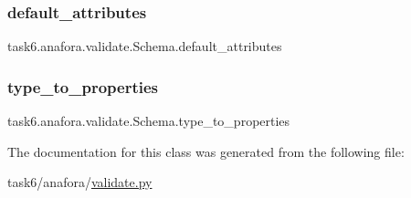 \subsubsection{\texorpdfstring{default\+\_\+attributes}{default\_attributes}}
{\footnotesize\ttfamily task6.\+anafora.\+validate.\+Schema.\+default\+\_\+attributes}

\mbox{\label{classtask6_1_1anafora_1_1validate_1_1Schema_a23290d2792456b0cf5b3a2b593bde8ec}} 
\subsubsection{\texorpdfstring{type\+\_\+to\+\_\+properties}{type\_to\_properties}}
{\footnotesize\ttfamily task6.\+anafora.\+validate.\+Schema.\+type\+\_\+to\+\_\+properties}



The documentation for this class was generated from the following file\+:\begin{DoxyCompactItemize}
\item 
task6/anafora/\hyperlink{validate_8py}{validate.\+py}\end{DoxyCompactItemize}
